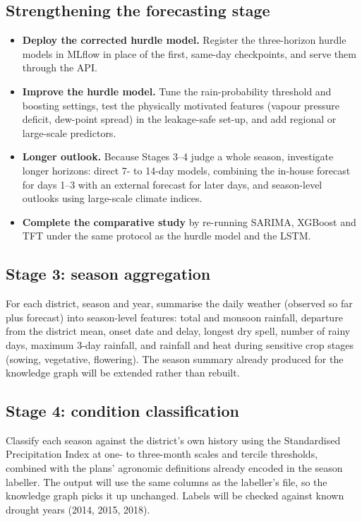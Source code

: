 \subsection{Strengthening the forecasting stage}
\begin{itemize}
	\item \textbf{Deploy the corrected hurdle model.} Register the three-horizon hurdle models in MLflow in place of the first, same-day checkpoints, and serve them through the API.
	\item \textbf{Improve the hurdle model.} Tune the rain-probability threshold and boosting settings, test the physically motivated features (vapour pressure deficit, dew-point spread) in the leakage-safe set-up, and add regional or large-scale predictors.
	\item \textbf{Longer outlook.} Because Stages 3--4 judge a whole season, investigate longer horizons: direct 7- to 14-day models, combining the in-house forecast for days 1--3 with an external forecast for later days, and season-level outlooks using large-scale climate indices.
	\item \textbf{Complete the comparative study} by re-running SARIMA, XGBoost and TFT under the same protocol as the hurdle model and the LSTM.
\end{itemize}

\subsection{Stage 3: season aggregation}
For each district, season and year, summarise the daily weather (observed so far plus forecast) into season-level features: total and monsoon rainfall, departure from the district mean, onset date and delay, longest dry spell, number of rainy days, maximum 3-day rainfall, and rainfall and heat during sensitive crop stages (sowing, vegetative, flowering). The season summary already produced for the knowledge graph will be extended rather than rebuilt.

\subsection{Stage 4: condition classification}
Classify each season against the district's own history using the Standardised Precipitation Index \cite{mckee1993relationship} at one- to three-month scales and tercile thresholds, combined with the plans' agronomic definitions already encoded in the season labeller. The output will use the same columns as the labeller's file, so the knowledge graph picks it up unchanged. Labels will be checked against known drought years (2014, 2015, 2018).

